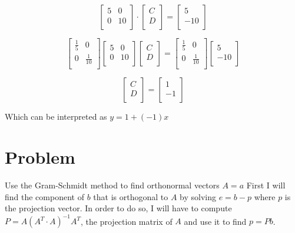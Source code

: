 \documentclass{article}
\begin{document}
\[
\begin{bmatrix}
5 & 0 \\
0 & 10 \\
\end{bmatrix}
\cdot
\begin{bmatrix}
C \\
D \\
\end{bmatrix}
=
\begin{bmatrix}
5 \\
-10 \\
\end{bmatrix}
\]

\[
\begin{bmatrix}
\frac{1}{5} & 0 \\
0 & \frac{1}{10} \\
\end{bmatrix}
\begin{bmatrix}
5 & 0 \\
0 & 10 \\
\end{bmatrix}
\begin{bmatrix}
C \\
D \\
\end{bmatrix}
=
\begin{bmatrix}
\frac{1}{5} & 0 \\
0 & \frac{1}{10} \\
\end{bmatrix}
\begin{bmatrix}
5 \\
-10 \\
\end{bmatrix}
\]

\[
\begin{bmatrix}
C \\
D \\
\end{bmatrix}
=
\begin{bmatrix}
1 \\
-1 \\
\end{bmatrix}
\]

Which can be interpreted as $y = 1 + (-1)x$


\section{Problem}
Use the Gram-Schmidt method to find orthonormal vectors
\newline
$A = a$
\newline
First I will find the component of $b$ that is orthogonal to $A$ by solving $e = b - p$ where $p$ is the projection vector. In order to do so, I will have to compute $P = A(A^{T}\cdot A)^{-1}A^{T}$, the projection matrix of $A$ and use it to find $p = Pb$.
\end{document}
